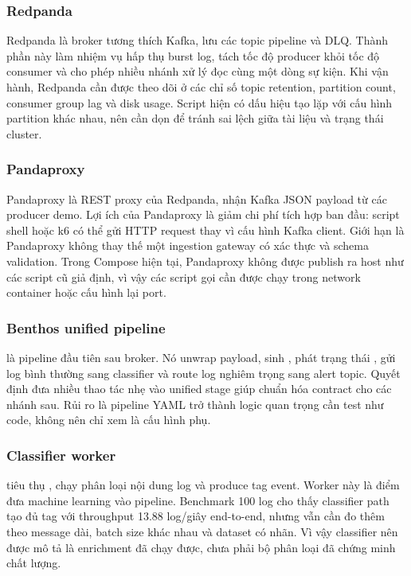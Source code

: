\subsubsection{Redpanda}

Redpanda là broker tương thích Kafka, lưu các topic pipeline và DLQ. Thành phần này làm nhiệm vụ hấp thụ burst log, tách tốc độ producer khỏi tốc độ consumer và cho phép nhiều nhánh xử lý đọc cùng một dòng sự kiện. Khi vận hành, Redpanda cần được theo dõi ở các chỉ số topic retention, partition count, consumer group lag và disk usage. Script  hiện có dấu hiệu tạo  lặp với cấu hình partition khác nhau, nên cần dọn để tránh sai lệch giữa tài liệu và trạng thái cluster.

\subsubsection{Pandaproxy}

Pandaproxy là REST proxy của Redpanda, nhận Kafka JSON payload từ các producer demo. Lợi ích của Pandaproxy là giảm chi phí tích hợp ban đầu: script shell hoặc k6 có thể gửi HTTP request thay vì cấu hình Kafka client. Giới hạn là Pandaproxy không thay thế một ingestion gateway có xác thực và schema validation. Trong Compose hiện tại, Pandaproxy không được publish ra host như các script cũ giả định, vì vậy các script gọi  cần được chạy trong network container hoặc cấu hình lại port.

\subsubsection{Benthos unified pipeline}

 là pipeline đầu tiên sau broker. Nó unwrap payload, sinh , phát trạng thái , gửi log bình thường sang classifier và route log nghiêm trọng sang alert topic. Quyết định đưa nhiều thao tác nhẹ vào unified stage giúp chuẩn hóa contract cho các nhánh sau. Rủi ro là pipeline YAML trở thành logic quan trọng cần test như code, không nên chỉ xem là cấu hình phụ.

\subsubsection{Classifier worker}

 tiêu thụ , chạy phân loại nội dung log và produce tag event. Worker này là điểm đưa machine learning vào pipeline. Benchmark 100 log cho thấy classifier path tạo đủ tag với throughput 13.88 log/giây end-to-end, nhưng vẫn cần đo thêm theo message dài, batch size khác nhau và dataset có nhãn. Vì vậy classifier nên được mô tả là enrichment đã chạy được, chưa phải bộ phân loại đã chứng minh chất lượng.

